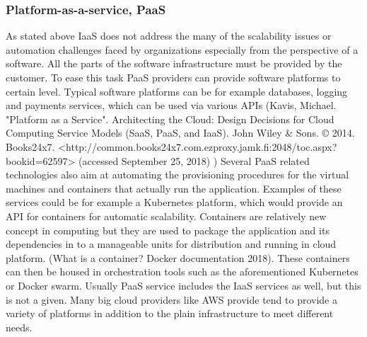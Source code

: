 \documentclass{article}
\begin{document}
\subsubsection{Platform-as-a-service, PaaS}
As stated above IaaS does not address the many of the scalability issues or automation challenges faced by organizations especially from the perspective of a software. All the parts of the software infrastructure must be provided by the customer. To ease this task PaaS providers can provide software platforms to certain level. Typical software platforms can be for example databases, logging and payments services, which can be used via various APIs (Kavis, Michael. "Platform as a Service". Architecting the Cloud: Design Decisions for Cloud Computing Service Models (SaaS, PaaS, and IaaS). John Wiley & Sons. © 2014. Books24x7. <http://common.books24x7.com.ezproxy.jamk.fi:2048/toc.aspx?bookid=62597> (accessed September 25, 2018) )
Several PaaS related technologies also aim at automating the provisioning procedures for the virtual machines and containers that actually run the application. Examples of these services could be for example a Kubernetes platform, which would provide an API for containers for automatic scalability. Containers are relatively new concept in computing but they are used to package the application and its dependencies in to a manageable units for distribution and running in cloud platform. (What is a container? Docker documentation 2018). These containers can then be housed in orchestration tools such as the aforementioned Kubernetes or Docker swarm. 
Usually PaaS service includes the IaaS services as well, but this is not a given. Many big cloud providers like AWS provide tend to provide a variety of platforms in addition to the plain infrastructure to meet different needs.
\end{document}
